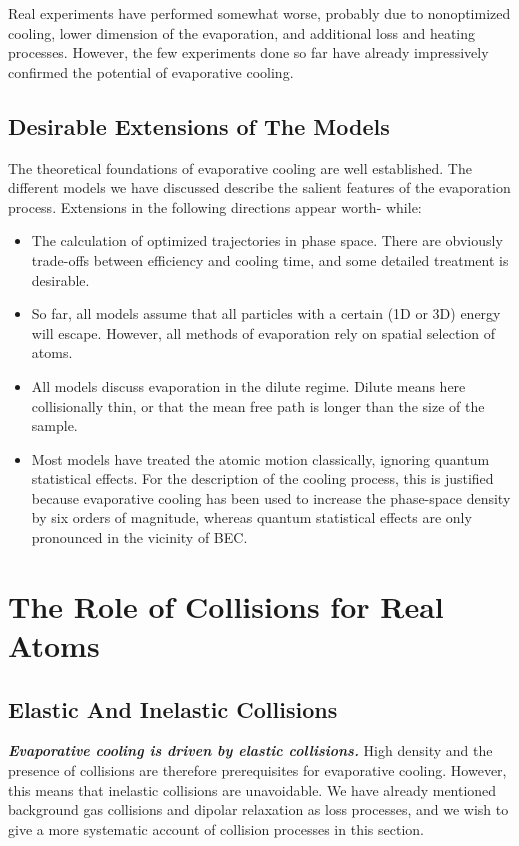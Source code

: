 \documentclass[12]{article}
\begin{document}
Real experiments have performed somewhat worse, probably due to nonoptimized cooling, lower dimension of the evaporation, and additional loss and heating processes. However, the few experiments done so far have already impressively confirmed the potential of evaporative cooling.
 \subsection{Desirable Extensions of The Models}   
   The theoretical foundations of evaporative cooling are well established. The different models we have discussed describe the salient features of the evaporation process. Extensions in the following directions appear worth- while:
   
   \begin{itemize}
  \item The calculation of optimized trajectories in phase space. There are obviously trade-offs between efficiency and cooling time, and some detailed treatment is desirable.
  \item So far, all models assume that all particles with a certain (1D or 3D) energy will escape. However, all methods of evaporation rely on spatial selection of atoms.
  \item All models discuss evaporation in the dilute regime. Dilute means here collisionally thin, or that the mean free path is longer than the size of the sample.
  \item Most models have treated the atomic motion classically, ignoring quantum statistical effects. For the description of the cooling process, this is justified because evaporative cooling has been used to increase the phase-space density by six orders of magnitude, whereas quantum statistical effects are only pronounced in the vicinity of BEC. 
\end{itemize}
\section{The Role of Collisions for Real Atoms}
\subsection{Elastic And Inelastic Collisions}
\textbf{\textit{Evaporative cooling is driven by elastic collisions.}} High density and the presence of collisions are therefore prerequisites for evaporative cooling. However, this means that inelastic collisions are unavoidable. We have already mentioned background gas collisions and dipolar relaxation as loss processes, and we wish to give a more systematic account of collision processes in this section.
\end{document}
